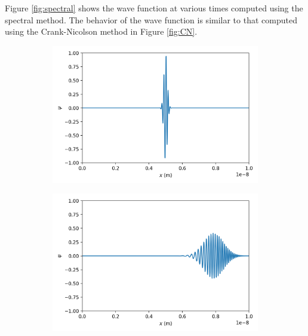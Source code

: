 \documentclass[11pt]{article}
\begin{document}
Figure \ref{fig:spectral} shows the wave function at various times computed using the spectral method. The behavior of the wave function is similar to that computed using the Crank-Nicolson method in Figure \ref{fig:CN}.
\begin{figure}[H]
    \centering
    \begin{subfigure}[H]{0.48\textwidth}
        \centering
        \includegraphics[width=\textwidth]{Figs/ps-10-2-0.png}
    \end{subfigure}
    \hfill
    \centering
    \begin{subfigure}[H]{0.48\textwidth}
        \centering
        \includegraphics[width=\textwidth]{Figs/ps-10-2-1.png}
    \end{subfigure}


\end{figure}
\end{document}
